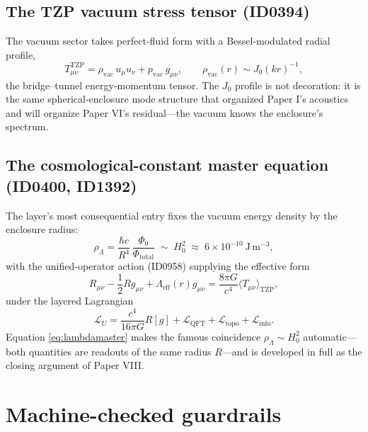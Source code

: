 \documentclass[11pt]{article}
\theoremstyle{remark}
\begin{document}
\subsection{The TZP vacuum stress tensor (ID0394)}

The vacuum sector takes perfect-fluid form with a Bessel-modulated radial profile,
\begin{equation}
T^{\mathrm{TZP}}_{\mu\nu} = \rho_{\mathrm{vac}}\, u_\mu u_\nu + p_{\mathrm{vac}}\, g_{\mu\nu}, \qquad
\rho_{\mathrm{vac}}(r) \sim J_0(kr)^{-1},
\label{eq:vacstress}
\end{equation}
the bridge--tunnel energy-momentum tensor. The $J_0$ profile is not decoration: it is the same spherical-enclosure mode structure that organized Paper I's acoustics and will organize Paper VI's residual---the vacuum knows the enclosure's spectrum.

\subsection{The cosmological-constant master equation (ID0400, ID1392)}

The layer's most consequential entry fixes the vacuum energy density by the enclosure radius:
\begin{equation}
\rho_\Lambda = \frac{\hbar c}{R^4}\, \frac{\Phi_0}{\Phi_{\mathrm{total}}} \;\sim\; H_0^2 \;\approx\; 6 \times 10^{-10}\ \mathrm{J\,m^{-3}},
\label{eq:lambdamaster}
\end{equation}
with the unified-operator action (ID0958) supplying the effective form
\begin{equation}
R_{\mu\nu} - \frac{1}{2}Rg_{\mu\nu}
+ \Lambda_{\mathrm{eff}}(r) g_{\mu\nu}
= \frac{8\pi G}{c^4}\langle T_{\mu\nu}\rangle_{\mathrm{TZP}},
\label{eq:effectiveeinstein}
\end{equation}
under the layered Lagrangian
\begin{equation}
\mathcal{L}_U =
\frac{c^4}{16\pi G}R[g]
+ \mathcal{L}_{\mathrm{QFT}}
+ \mathcal{L}_{\mathrm{topo}}
+ \mathcal{L}_{\mathrm{info}}.
\label{eq:layeredlagrangian}
\end{equation}
Equation \eqref{eq:lambdamaster} makes the famous coincidence $\rho_\Lambda \sim H_0^2$ automatic---both quantities are readouts of the same radius $R$---and is developed in full as the closing argument of Paper VIII.

\section{Machine-checked guardrails}
\label{sec:guardrails}
\end{document}
